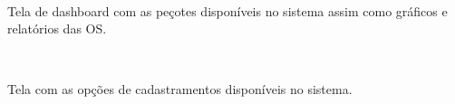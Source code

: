 \begin{figure}[H]
	\centering
	\mbox{%
		\qquad
	}
	
\end{figure}
\newpage
Tela de dashboard com as peçotes disponíveis no sistema assim como gráficos e relatórios das OS.

\begin{figure}[htb]
	\centering
	\mbox{%
		\qquad
	}
	
\end{figure}
\newpage

Tela com as opções de cadastramentos disponíveis no sistema.

